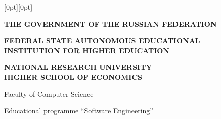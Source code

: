 \thispagestyle{approval}
\enlargethispage{3cm}

\noindent
\raisebox{-25cm}[0pt][0pt]{%
%
}%

\begin{center}
\textbf{THE GOVERNMENT OF THE RUSSIAN FEDERATION}

\textbf{FEDERAL STATE AUTONOMOUS EDUCATIONAL\\
INSTITUTION FOR HIGHER EDUCATION}

\textbf{NATIONAL RESEARCH UNIVERSITY\\
HIGHER SCHOOL OF ECONOMICS}

\vspace{0.2cm}

\small
Faculty of Computer Science

Educational programme \enquote{Software Engineering}
\end{center}

\vspace{0.3cm}

